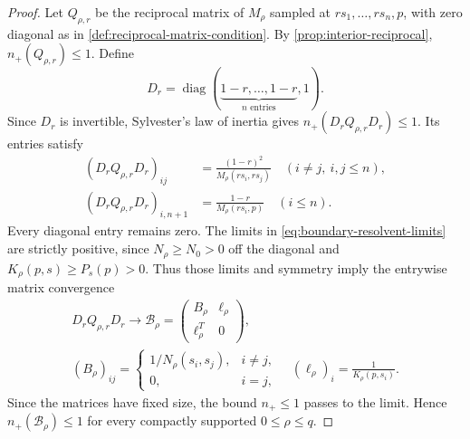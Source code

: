 \begin{proof}
Let $Q_{\rho,r}$ be the reciprocal matrix of $M_\rho$ sampled at
$rs_1,\ldots,rs_n,p$, with zero diagonal as in
\cref{def:reciprocal-matrix-condition}.
By \cref{prop:interior-reciprocal}, $n_+(Q_{\rho,r})\le1$.
Define
\[
 D_r=\operatorname{diag}(
 \underbrace{1-r,\ldots,1-r}_{n\text{ entries}},1).
\]
Since $D_r$ is invertible, Sylvester's law of inertia gives
$n_+(D_rQ_{\rho,r}D_r)\le1$. Its entries satisfy
\[
 \begin{aligned}
 (D_rQ_{\rho,r}D_r)_{ij}
 &=\frac{(1-r)^2}{M_\rho(rs_i,rs_j)}\quad(i\ne j,\ i,j\le n),\\
 (D_rQ_{\rho,r}D_r)_{i,n+1}
 &=\frac{1-r}{M_\rho(rs_i,p)}\quad(i\le n).
 \end{aligned}
\]
Every diagonal entry remains zero. The limits in
\eqref{eq:boundary-resolvent-limits} are strictly positive, since
$N_\rho\ge N_0>0$ off the diagonal and $K_\rho(p,s)\ge P_s(p)>0$.
Thus those limits and symmetry imply the entrywise matrix convergence
\begin{equation}\label{eq:compact-bordered-limit}
 \begin{gathered}
 D_rQ_{\rho,r}D_r\longrightarrow
 \mathcal B_\rho=\begin{pmatrix}B_\rho&\ell_\rho\\\ell_\rho^T&0\end{pmatrix},
 \\
 (B_\rho)_{ij}=\begin{cases}
 1/N_\rho(s_i,s_j),&i\ne j,\\0,&i=j,
 \end{cases}
 \quad (\ell_\rho)_i=\frac1{K_\rho(p,s_i)}.
 \end{gathered}
\end{equation}
Since the matrices have fixed size, the bound $n_+\le1$ passes to
the limit. Hence $n_+(\mathcal B_\rho)\le1$ for every compactly
supported $0\le\rho\le q$.


\end{proof}
